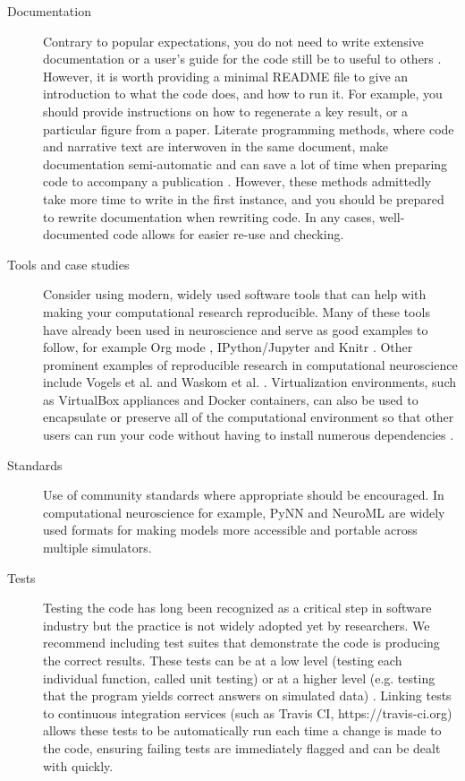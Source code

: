 \documentclass[11pt]{article}
\begin{document}
\begin{description}
\item [Documentation] Contrary to popular expectations, you do not
  need to write extensive documentation or a user's guide for the code
  still be to useful to others \cite{Barnes2010-iv}.  However, it is
  worth providing a minimal README file to give an introduction to
  what the code does, and how to run it.  For example, you should
  provide instructions on how to regenerate a key result, or a
  particular figure from a paper. Literate programming methods, where
  code and narrative text are interwoven in the same document, make
  documentation semi-automatic and can save a lot of time when
  preparing code to accompany a publication \cite{schulte2012multi,
    gentleman2012statistical}. However, these methods admittedly take
  more time to write in the first instance, and you should be prepared
  to rewrite documentation when rewriting code.  In any cases,
  well-documented code allows for easier re-use and checking.

\item [Tools and case studies] Consider using modern, widely used software tools that can help with making your computational research reproducible.  Many of
  these tools have already been used in neuroscience and serve as good
  examples to follow, for example Org mode \cite{Delescluse2011},
  IPython/Jupyter \cite{Stevens2013} and Knitr \cite{Eglen2014}.  Other
  prominent examples of reproducible research in computational
  neuroscience include Vogels et al. \cite{Vogels2011-c8c} and Waskom
  et al. \cite{Waskom2014-gd}.  
  Virtualization environments, such as VirtualBox appliances and
  Docker containers, can also be used to
  encapsulate or preserve all of the computational environment so that
  other users can run your code without having to install numerous
  dependencies \cite{Boettiger2015}.

\item [Standards] Use of community standards where appropriate should
  be encouraged. In computational neuroscience for example, PyNN
  \cite{Davison2009} and NeuroML \cite{CannonEtAl2014} are widely used
  formats for making models more accessible and portable across
  multiple simulators.

\item [Tests] Testing the code has long been recognized
  as a critical step in software industry but the practice is not
  widely adopted yet by researchers. We recommend including test
  suites that demonstrate the code is producing the correct
  results\cite{Axelrod2014-xi}. These tests can be at a low level
  (testing each individual function, called unit testing) or at a
  higher level (e.g. testing that the program yields correct answers
  on simulated data) \cite{wilson_best_2014}. Linking tests to continuous 
  integration services (such as Travis CI, https://travis-ci.org) allows 
  these tests to be automatically run each time a change is made to the code,
  ensuring failing tests are immediately flagged and can be dealt with quickly.

\end{description}
\end{document}
